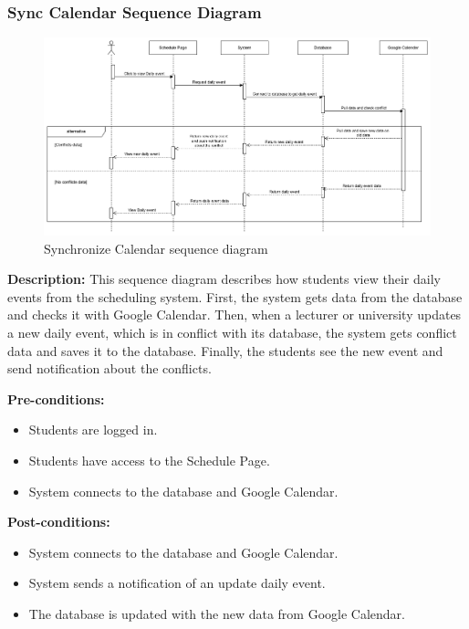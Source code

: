 \subsubsection{Sync Calendar Sequence Diagram}
    \begin{figure}[H]
        \centering
        \includegraphics[width=1\textwidth, height=0.3\textheight]{image/SyncCalendar.png} 
        \caption{Synchronize Calendar sequence diagram}
        \label{fig:sync_calendar_sequence}
    \end{figure}

    \textbf{Description:} This sequence diagram describes how students view their daily events from the scheduling system. 
    First, the system gets data from the database and checks it with Google Calendar. Then, when a lecturer or university updates a new daily event, which is in conflict with its database, the system gets conflict data and saves it to the database. 
    Finally, the students see the new event and send notification about the conflicts.

    \noindent \textbf{Pre-conditions:} 
        \begin{itemize}
            \item Students are logged in.
            \item Students have access to the Schedule Page.
            \item System connects to the database and Google Calendar.
        \end{itemize}
    \noindent \textbf{Post-conditions:}
    \begin{itemize}
        \item System connects to the database and Google Calendar.
        \item System sends a notification of an update daily event.
        \item The database is updated with the new data from Google Calendar.
    \end{itemize}

